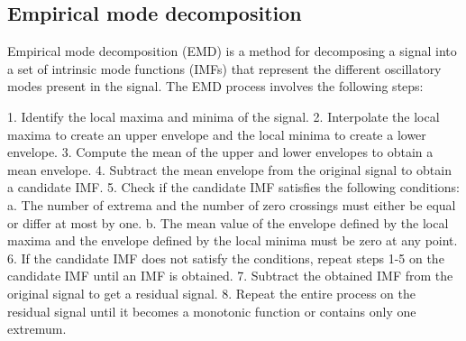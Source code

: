 \documentclass[a4paper, 12pt]{article}
\begin{document}
\subsection*{Empirical mode decomposition}

Empirical mode decomposition (EMD) is a method for decomposing a signal into a
set of intrinsic mode functions (IMFs) that represent the different oscillatory
modes present in the signal. The EMD process involves the following steps:

1. Identify the local maxima and minima of the signal.
2. Interpolate the local maxima to create an upper envelope and the local minima
to create a lower envelope.
3. Compute the mean of the upper and lower envelopes to obtain a mean envelope. 
4. Subtract the mean envelope from the original signal to obtain a candidate
IMF.
5. Check if the candidate IMF satisfies the following conditions:
   a. The number of extrema and the number of zero crossings must either be equal
   or differ at most by one.
   b. The mean value of the envelope defined by the local maxima and the
   envelope defined by the local minima must be zero at any point.
6. If the candidate IMF does not satisfy the conditions, repeat steps 1-5 on
the candidate IMF until an IMF is obtained.
7. Subtract the obtained IMF from the original signal to get a residual signal.
8. Repeat the entire process on the residual signal until it becomes a monotonic
function or contains only one extremum.
\end{document}
